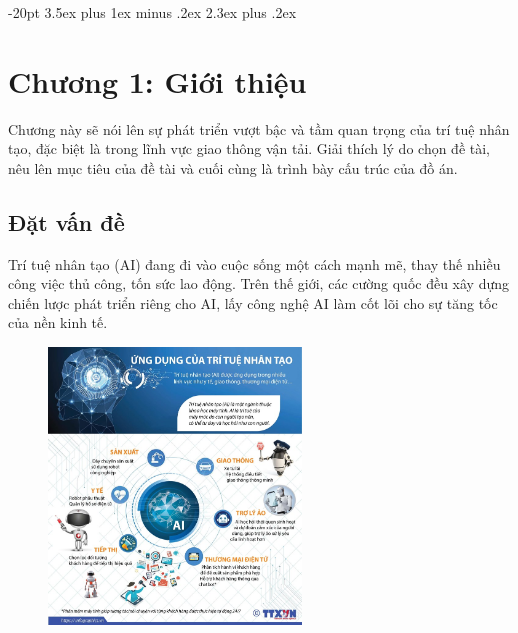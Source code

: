 \documentclass[14pt,oneside,a4paper]{extreport}
\begin{document}

\pagebreak


\pagebreak


\pagebreak

\normalsize
\tableofcontents{}

\large
\makeatletter
\renewcommand\thesection{}
\renewcommand\thesubsection{\arabic{section}.\arabic{subsection}.}
\renewcommand\thesubsubsection{\thesubsection\arabic{subsubsection}.}
\makeatother

\titlespacing{\section}
{-20pt}%
{3.5ex plus 1ex minus .2ex}%
{2.3ex plus .2ex}%

\section{Chương 1: Giới thiệu}
Chương này sẽ nói lên sự phát triển vượt bậc và tầm quan trọng của trí tuệ nhân tạo, đặc biệt là trong lĩnh vực giao thông vận tải. Giải thích lý do chọn đề tài, nêu lên mục tiêu của đề tài và cuối cùng là trình bày cấu trúc của đồ án.
\subsection{Đặt vấn đề}
Trí tuệ nhân tạo (AI) đang đi vào cuộc sống một cách mạnh mẽ, thay thế nhiều công việc thủ công, tốn sức lao động. Trên thế giới, các cường quốc đều xây dựng chiến lược phát triển riêng cho AI, lấy công nghệ AI làm cốt lõi cho sự tăng tốc của nền kinh tế. 

\begin{figure}[h]
	\includegraphics[width=0.6\textwidth]{image1.jpg}
	\centering
\end{figure}
\end{document}
